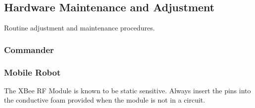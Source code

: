 \documentclass[11pt,a4paper]{article}
\begin{document}
  \subsection{Hardware Maintenance and Adjustment}
    Routine adjustment and maintenance procedures.
    \subsubsection{Commander}
    
    \subsubsection{Mobile Robot}
    The XBee RF Module is known to be static sensitive. Always insert the pins into the conductive foam provided when the module is not in a circuit. 
\end{document}
